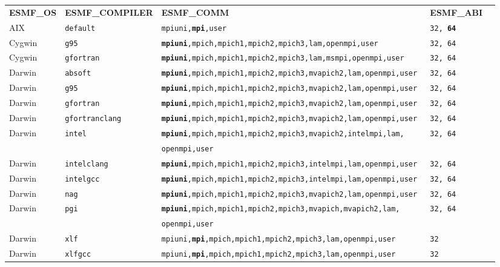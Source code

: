 \begin{longtable}{lllll}
  {\bfseries\footnotesize ESMF\_OS} &{\bfseries\footnotesize ESMF\_COMPILER} & {\bfseries\footnotesize ESMF\_COMM} & {\bfseries\footnotesize ESMF\_ABI} \\

AIX     &\tt default     &\footnotesize \tt mpiuni,{\bf mpi},user      &\tt 32, {\bf 64} \\
Cygwin  &\tt g95         &\footnotesize \tt {\bf mpiuni},mpich,mpich1,mpich2,mpich3,lam,openmpi,user &\tt 32, 64 \\
Cygwin  &\tt gfortran    &\footnotesize \tt {\bf mpiuni},mpich,mpich1,mpich2,mpich3,lam,msmpi,openmpi,user &\tt 32, 64 \\
Darwin  &\tt absoft      &\footnotesize \tt {\bf mpiuni},mpich,mpich1,mpich2,mpich3,mvapich2,lam,openmpi,user &\tt 32, 64 \\
Darwin  &\tt g95         &\footnotesize \tt {\bf mpiuni},mpich,mpich1,mpich2,mpich3,mvapich2,lam,openmpi,user &\tt 32, 64 \\
Darwin  &\tt gfortran    &\footnotesize \tt {\bf mpiuni},mpich,mpich1,mpich2,mpich3,mvapich2,lam,openmpi,user &\tt 32, 64 \\
Darwin  &\tt gfortranclang &\footnotesize \tt {\bf mpiuni},mpich,mpich1,mpich2,mpich3,mvapich2,lam,openmpi,user &\tt 32, 64 \\
Darwin  &\tt intel       &\footnotesize \tt {\bf mpiuni},mpich,mpich1,mpich2,mpich3,mvapich2,intelmpi,lam, &\tt 32, 64 \\
        &                &\footnotesize \tt openmpi,user &  \\
Darwin  &\tt intelclang  &\footnotesize \tt {\bf mpiuni},mpich,mpich1,mpich2,mpich3,intelmpi,lam,openmpi,user &\tt 32, 64 \\
Darwin  &\tt intelgcc    &\footnotesize \tt {\bf mpiuni},mpich,mpich1,mpich2,mpich3,intelmpi,lam,openmpi,user &\tt 32, 64 \\
Darwin  &\tt nag         &\footnotesize \tt {\bf mpiuni},mpich,mpich1,mpich2,mpich3,mvapich2,lam,openmpi,user &\tt 32, 64 \\
Darwin  &\tt pgi         &\footnotesize \tt {\bf mpiuni},mpich,mpich1,mpich2,mpich3,mvapich,mvapich2,lam, &\tt 32, 64 \\
        &                &\footnotesize \tt openmpi,user &  \\
Darwin  &\tt xlf         &\footnotesize \tt mpiuni,{\bf mpi},mpich,mpich1,mpich2,mpich3,lam,openmpi,user &\tt 32 \\
Darwin  &\tt xlfgcc      &\footnotesize \tt mpiuni,{\bf mpi},mpich,mpich1,mpich2,mpich3,lam,openmpi,user &\tt 32 \\

\end{longtable}
